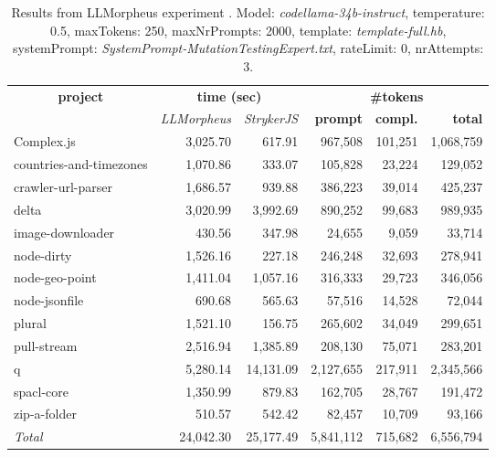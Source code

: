 
\begin{table*}[hbt!]
\centering
{\scriptsize
\begin{tabular}{l||r|r|r|r|r}
\multicolumn{1}{c|}{\bf project} & \multicolumn{2}{|c|}{\bf time (sec)} & \multicolumn{3}{|c|}{\bf \#tokens} \\
               & {\it LLMorpheus} & {\it StrykerJS} & {\bf prompt} & {\bf compl.} & {\bf total} \\
\hline
  Complex.js & 3,025.70 & 617.91 & 967,508 & 101,251 & 1,068,759 \\ 
countries-and-timezones & 1,070.86 & 333.07 & 105,828 & 23,224 & 129,052 \\ 
crawler-url-parser & 1,686.57 & 939.88 & 386,223 & 39,014 & 425,237 \\ 
delta & 3,020.99 & 3,992.69 & 890,252 & 99,683 & 989,935 \\ 
image-downloader & 430.56 & 347.98 & 24,655 & 9,059 & 33,714 \\ 
node-dirty & 1,526.16 & 227.18 & 246,248 & 32,693 & 278,941 \\ 
node-geo-point & 1,411.04 & 1,057.16 & 316,333 & 29,723 & 346,056 \\ 
node-jsonfile & 690.68 & 565.63 & 57,516 & 14,528 & 72,044 \\ 
plural & 1,521.10 & 156.75 & 265,602 & 34,049 & 299,651 \\ 
pull-stream & 2,516.94 & 1,385.89 & 208,130 & 75,071 & 283,201 \\ 
q & 5,280.14 & 14,131.09 & 2,127,655 & 217,911 & 2,345,566 \\ 
spacl-core & 1,350.99 & 879.83 & 162,705 & 28,767 & 191,472 \\ 
zip-a-folder & 510.57 & 542.42 & 82,457 & 10,709 & 93,166 \\ 
\hline
  \textit{Total} & 24,042.30 & 25,177.49 & 5,841,112 & 715,682 & 6,556,794 \\
  \end{tabular}
  }
  \\[2mm]
  \caption{Results from LLMorpheus experiment .
    Model: \textit{codellama-34b-instruct}, 
    temperature: 0.5, 
    maxTokens: 250, 
    maxNrPrompts: 2000, 
    template: \textit{template-full.hb}, 
    systemPrompt: \textit{SystemPrompt-MutationTestingExpert.txt}, 
    rateLimit: 0, 
    nrAttempts: 3.  
  }
  \label{table:Cost:run321:codellama-34b-instruct:template-full.hb:0.5}
\end{table*}